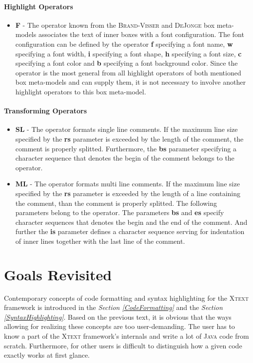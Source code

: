 \documentclass[12pt,notitlepage,a4paper]{report}
\begin{document}
\subsubsection{Highlight Operators}
\begin{itemize}
\item \textbf{F} - The operator known from the \textsc{Brand-Visser} and \textsc{DeJonge} box meta-models associates the text of inner boxes with a font configuration. The font configuration can be defined by the operator \textbf{f} specifying a font name, \textbf{w} specifying a font width, \textbf{i} specifying a font shape, \textbf{h} specifying a font size, \textbf{c} specifying a font color and \textbf{b} specifying a font background color. Since the operator is the most general from all highlight operators of both mentioned box meta-models and can supply them, it is not necessary to involve another highlight operators to this box meta-model.
\end{itemize} 

\subsubsection{Transforming Operators}
\begin{itemize}
\item \textbf{SL} - The operator formats single line comments. If the maximum line size specified by the \textbf{rs} parameter is exceeded by the length of the comment, the comment is properly splitted. Furthermore, the  \textbf{bs} parameter specifying a character sequence that denotes the begin of the comment belongs to the operator. 
\item \textbf{ML} - The operator formats multi line comments. If the maximum line size specified by the \textbf{rs} parameter is exceeded by the length of a line containing the comment, than the comment is properly splitted. The following  parameters belong to the operator. The parameters \textbf{bs} and \textbf{es} specify character sequences that denotes the begin and the end of the comment. And further the \textbf{is} parameter defines a character sequence serving for indentation of inner lines together with the last line of the comment.
\end{itemize}

\chapter{Goals Revisited}
\label{GoalsRevisited}
Contemporary concepts of code formatting and syntax highlighting for the \textsc{Xtext} framework is introduced in the \textit{Section \ref{CodeFormatting}} and the \textit{Section \ref{SyntaxHighlighting}}. Based on the previous text, it is obvious that the ways allowing for realizing these concepts are too user-demanding. The user has to know a part of the \textsc{Xtext} framework's internals and write a lot of \textsc{Java} code from scratch. Furthermore, for other users is difficult to distinguish how a given code exactly works at first glance.
\end{document}
